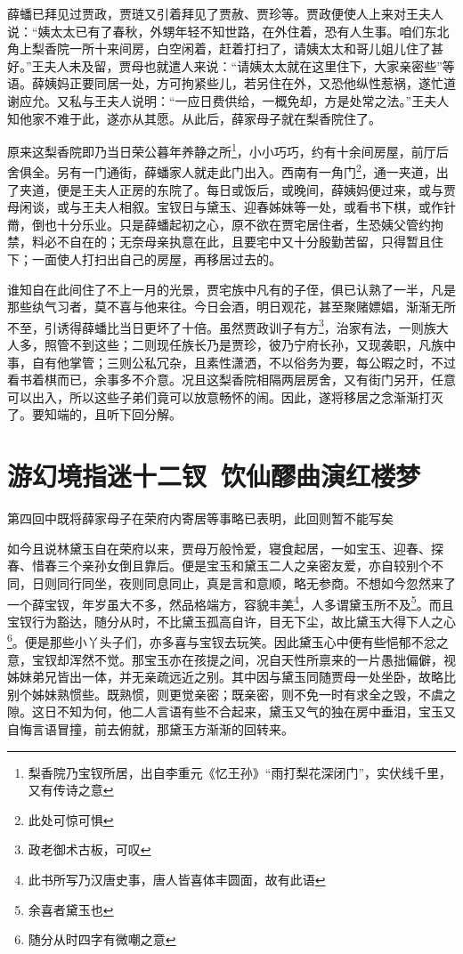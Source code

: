 \documentclass[12pt,oneside]{book}
\begin{document}
薛蟠已拜见过贾政，贾琏又引着拜见了贾赦、贾珍等。贾政便使人上来对王夫人说：“姨太太已有了春秋，外甥年轻不知世路，在外住着，恐有人生事。咱们东北角上梨香院一所十来间房，白空闲着，赶着打扫了，请姨太太和哥儿姐儿住了甚好。”王夫人未及留，贾母也就遣人来说：“请姨太太就在这里住下，大家亲密些”等语。薛姨妈正要同居一处，方可拘紧些儿，若另住在外，又恐他纵性惹祸，遂忙道谢应允。又私与王夫人说明：“一应日费供给，一概免却，方是处常之法。”王夫人知他家不难于此，遂亦从其愿。从此后，薛家母子就在梨香院住了。

原来这梨香院即乃当日荣公暮年养静之所\footnote{梨香院乃宝钗所居，出自李重元《忆王孙》“雨打梨花深闭门”，实伏线千里，又有传诗之意}，小小巧巧，约有十余间房屋，前厅后舍俱全。另有一门通街，薛蟠家人就走此门出入。西南有一角门\footnote{此处可惊可惧}，通一夹道，出了夹道，便是王夫人正房的东院了。每日或饭后，或晚间，薛姨妈便过来，或与贾母闲谈，或与王夫人相叙。宝钗日与黛玉、迎春姊妹等一处，或看书下棋，或作针黹，倒也十分乐业。只是薛蟠起初之心，原不欲在贾宅居住者，生恐姨父管约拘禁，料必不自在的；无奈母亲执意在此，且要宅中又十分殷勤苦留，只得暂且住下；一面使人打扫出自己的房屋，再移居过去的。

谁知自在此间住了不上一月的光景，贾宅族中凡有的子侄，俱已认熟了一半，凡是那些纨气习者，莫不喜与他来往。今日会酒，明日观花，甚至聚赌嫖娼，渐渐无所不至，引诱得薛蟠比当日更坏了十倍。虽然贾政训子有方\footnote{政老御术古板，可叹}，治家有法，一则族大人多，照管不到这些；二则现任族长乃是贾珍，彼乃宁府长孙，又现袭职，凡族中事，自有他掌管；三则公私冗杂，且素性潇洒，不以俗务为要，每公暇之时，不过看书着棋而已，余事多不介意。况且这梨香院相隔两层房舍，又有街门另开，任意可以出入，所以这些子弟们竟可以放意畅怀的闹。因此，遂将移居之念渐渐打灭了。要知端的，且听下回分解。


\chapter{游幻境指迷十二钗~饮仙醪曲演红楼梦}
第四回中既将薛家母子在荣府内寄居等事略已表明，此回则暂不能写矣

如今且说林黛玉自在荣府以来，贾母万般怜爱，寝食起居，一如宝玉、迎春、探春、惜春三个亲孙女倒且靠后。便是宝玉和黛玉二人之亲密友爱，亦自较别个不同，日则同行同坐，夜则同息同止，真是言和意顺，略无参商。不想如今忽然来了一个薛宝钗，年岁虽大不多，然品格端方，容貌丰美\footnote{此书所写乃汉唐史事，唐人皆喜体丰圆面，故有此语}，人多谓黛玉所不及\footnote{余喜者黛玉也}。而且宝钗行为豁达，随分从时，不比黛玉孤高自许，目无下尘，故比黛玉大得下人之心\footnote{随分从时四字有微嘲之意}。便是那些小丫头子们，亦多喜与宝钗去玩笑。因此黛玉心中便有些悒郁不忿之意，宝钗却浑然不觉。那宝玉亦在孩提之间，况自天性所禀来的一片愚拙偏僻，视姊妹弟兄皆出一体，并无亲疏远近之别。其中因与黛玉同随贾母一处坐卧，故略比别个姊妹熟惯些。既熟惯，则更觉亲密；既亲密，则不免一时有求全之毁，不虞之隙。这日不知为何，他二人言语有些不合起来，黛玉又气的独在房中垂泪，宝玉又自悔言语冒撞，前去俯就，那黛玉方渐渐的回转来。
\end{document}
